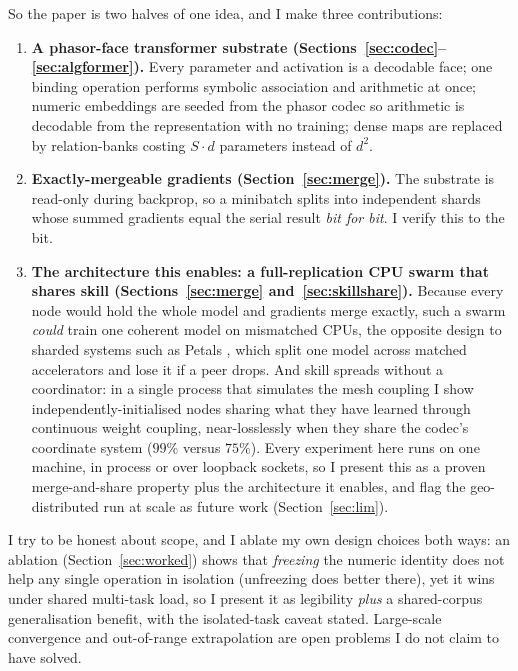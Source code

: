\documentclass[11pt]{article}
\begin{document}
So the paper is two halves of one idea, and I make three contributions:

\begin{enumerate}
\item \textbf{A phasor-face transformer substrate (Sections~\ref{sec:codec}--\ref{sec:algformer}).}
Every parameter and activation is a decodable face; one binding operation performs symbolic
association and arithmetic at once; numeric embeddings are seeded from the phasor codec so arithmetic
is decodable from the representation with no training; dense maps are replaced by relation-banks
costing $S\cdot d$ parameters instead of $d^2$.
\item \textbf{Exactly-mergeable gradients (Section~\ref{sec:merge}).} The substrate is read-only during
backprop, so a minibatch splits into independent shards whose summed gradients equal the serial result
\emph{bit for bit}. I verify this to the bit.
\item \textbf{The architecture this enables: a full-replication CPU swarm that shares skill
(Sections~\ref{sec:merge} and~\ref{sec:skillshare}).} Because every node would hold the whole model and
gradients merge exactly, such a swarm \emph{could} train one coherent model on mismatched CPUs, the
opposite design to sharded systems such as Petals \parencite{borzunov2023petals}, which split one model
across matched accelerators and lose it if a peer drops. And skill spreads without a coordinator: in a
single process that simulates the mesh coupling I show independently-initialised nodes sharing what they
have learned through continuous weight coupling, near-losslessly when they share the codec's coordinate
system ($99\%$ versus $75\%$). Every experiment here runs on one machine, in process or over loopback
sockets, so I present this as a proven merge-and-share property plus the architecture it enables, and flag
the geo-distributed run at scale as future
work (Section~\ref{sec:lim}).
\end{enumerate}

I try to be honest about scope, and I ablate my own design choices both ways: an ablation
(Section~\ref{sec:worked}) shows that \emph{freezing} the numeric identity does not help any single
operation in isolation (unfreezing does better there), yet it wins under shared multi-task load, so I
present it as legibility \emph{plus} a shared-corpus generalisation benefit, with the isolated-task
caveat stated. Large-scale convergence and out-of-range extrapolation are open problems I do not claim
to have solved.
\end{document}
